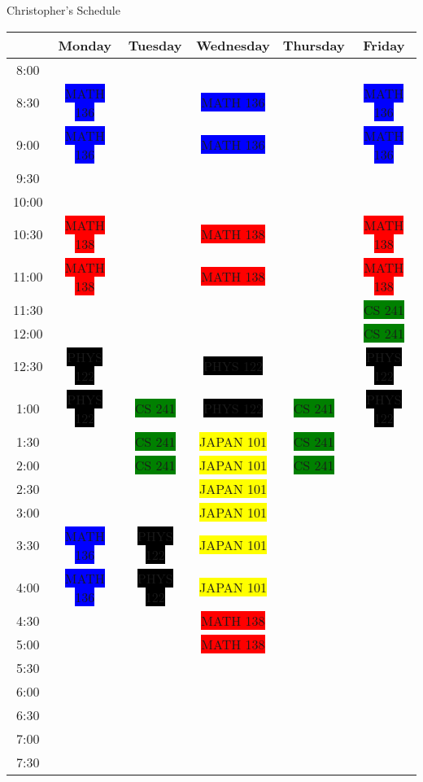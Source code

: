 \documentclass{article}
\begin{document}
	 \begin {center}
	 \Huge
	Christopher's Schedule
	 \end {center}
	
\newcommand{\cs}{\colorbox{green}{CS 241}}
\newcommand{\japan}{\colorbox{yellow}{JAPAN 101}}
\newcommand{\algebra}{\colorbox{blue}{MATH 136}}
\newcommand{\calc}{\colorbox{red}{MATH 138}}
\newcommand{\phys}{\colorbox{black}{\color{white}PHYS 122}}
\begin{tabular}{|c|c|c|c|c|c|}
	\hline
	
 &Monday&Tuesday&Wednesday&Thursday&Friday\\\hline
8:00& & & & & \\\hline
8:30&\algebra& &\algebra& &\algebra\\\hline
9:00&\algebra& &\algebra& &\algebra\\\hline
9:30& & & & & \\\hline
10:00& & & & & \\\hline
10:30&\calc& &\calc& &\calc\\\hline
11:00&\calc& &\calc& &\calc\\\hline
11:30& & & & &\cs\\\hline
12:00& & & & &\cs\\\hline
12:30&\phys& &\phys& &\phys\\\hline
1:00&\phys&\cs&\phys&\cs&\phys\\\hline
1:30& &\cs&\japan&\cs& \\\hline
2:00& &\cs&\japan&\cs& \\\hline
2:30& & &\japan& & \\\hline
3:00& & &\japan& & \\\hline
3:30&\algebra&\phys&\japan& & \\\hline
4:00&\algebra&\phys&\japan& & \\\hline
4:30& & &\calc& & \\\hline
5:00& & &\calc& & \\\hline
5:30& & & & & \\\hline
6:00& & & & & \\\hline
6:30& & & & & \\\hline
7:00& & & & & \\\hline
7:30& & & & & \\\hline
\end{tabular}
	
\end{document}
